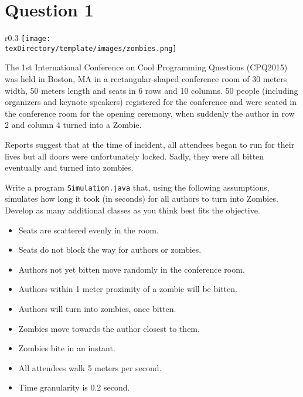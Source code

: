 \documentclass[12pt,letterpaper,twoside]{article}
\begin{document}


\section*{Question 1}

\begin{wrapfigure}{r}{0.3\textwidth}
\centering
\texttt{[image: \\texDirectory/template/images/zombies.png]}
\end{wrapfigure}

The 1st International Conference on Cool Programming Questions (CPQ2015) was held in Boston, MA in a rectangular-shaped conference room of 30 meters width, 50 meters length and seats in 6 rows and 10 columns. 50 people (including organizers and keynote speakers) registered for the conference and were seated in the conference room for the opening ceremony, when suddenly the author in row 2 and column 4 turned into a Zombie.

Reports suggest that at the time of incident, all attendees began to run for their lives but all doors were unfortunately locked. Sadly, they were all bitten eventually and turned into zombies.

Write a program \texttt{Simulation.java} that, using the following assumptions, simulates how long it took (in seconds) for all authors to turn into Zombies. Develop as many additional classes as you think best fits the objective.

\begin{itemize}[itemsep=1mm]\parskip=0pt
\item[] Seats are scattered evenly in the room.
\item[] Seats do not block the way for authors or zombies.
\item[] Authors not yet bitten move randomly in the conference room.
\item[] Authors within 1 meter proximity of a zombie will be bitten.
\item[] Authors will turn into zombies, once bitten.
\item[] Zombies move towards the author closest to them.
\item[] Zombies bite in an instant.
\item[] All attendees walk 5 meters per second.
\item[] Time granularity is 0.2 second.
\end{itemize}
\end{document}
